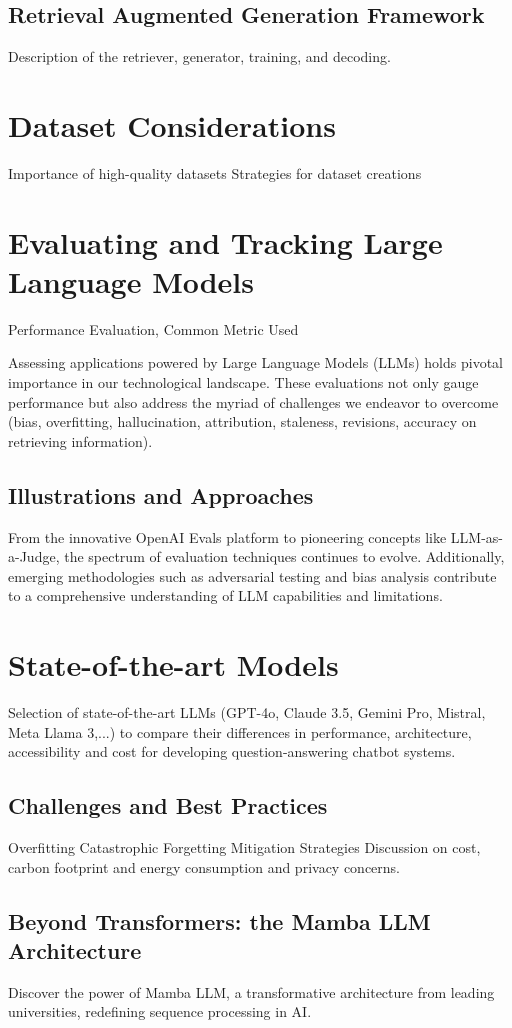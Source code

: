 \subsection{Retrieval Augmented Generation Framework}
Description of the retriever, generator, training, and decoding.

\section{Dataset Considerations}
Importance of high-quality datasets
Strategies for dataset creations

\section{Evaluating and Tracking Large Language Models}
Performance Evaluation, Common Metric Used

Assessing applications powered by Large Language Models (LLMs) holds pivotal importance in our technological landscape. These evaluations not only gauge performance but also address the myriad of challenges we endeavor to overcome (bias, overfitting, hallucination, attribution, staleness, revisions, accuracy on retrieving information).

\subsection{Illustrations and Approaches}

From the innovative OpenAI Evals platform to pioneering concepts like LLM-as-a-Judge, the spectrum of evaluation techniques continues to evolve. Additionally, emerging methodologies such as adversarial testing and bias analysis contribute to a comprehensive understanding of LLM capabilities and limitations.


\newpage

\section{State-of-the-art Models}
Selection of state-of-the-art LLMs (GPT-4o, Claude 3.5, Gemini Pro, Mistral, Meta Llama 3,...) to compare their differences in performance, architecture, accessibility and cost for developing question-answering chatbot systems.

\subsection{Challenges and Best Practices}
Overfitting
Catastrophic Forgetting
Mitigation Strategies
Discussion on cost, carbon footprint and energy consumption and privacy concerns.

\subsection{Beyond Transformers: the Mamba LLM Architecture}
Discover the power of Mamba LLM, a transformative architecture from leading universities, redefining sequence processing in AI.

